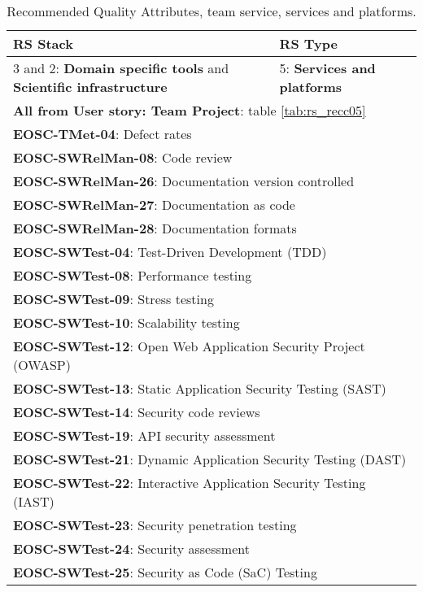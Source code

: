\begin{center}
\begin{table}

  \label{tab:rs_recc08}
  \small
  \begin{tabular}{|p{0.65\linewidth}|p{0.35\linewidth}|} \hline

    \textbf{RS Stack} & \textbf{RS Type} \\ \hline  \hline
    3 and 2: \textbf{Domain specific tools} and \textbf{Scientific infrastructure} &
    5: \textbf{Services and platforms} \\ \hline \hline
    \multicolumn{2}{|l|}{\textbf{All from User story: Team Project}: table \ref{tab:rs_recc05}} \\ \hline
    \multicolumn{2}{|l|}{\textbf{EOSC-TMet-04}: Defect rates} \\ \hline
    \multicolumn{2}{|l|}{\textbf{EOSC-SWRelMan-08}: Code review} \\ \hline
    \multicolumn{2}{|l|}{\textbf{EOSC-SWRelMan-26}: Documentation version controlled} \\ \hline
    \multicolumn{2}{|l|}{\textbf{EOSC-SWRelMan-27}: Documentation as code} \\ \hline
    \multicolumn{2}{|l|}{\textbf{EOSC-SWRelMan-28}: Documentation formats} \\ \hline
    \multicolumn{2}{|l|}{\textbf{EOSC-SWTest-04}: Test-Driven Development (TDD)} \\ \hline
    \multicolumn{2}{|l|}{\textbf{EOSC-SWTest-08}: Performance testing} \\ \hline
    \multicolumn{2}{|l|}{\textbf{EOSC-SWTest-09}: Stress testing} \\ \hline
    \multicolumn{2}{|l|}{\textbf{EOSC-SWTest-10}: Scalability testing} \\ \hline
    \multicolumn{2}{|l|}{\textbf{EOSC-SWTest-12}: Open Web Application Security Project (OWASP)} \\ \hline
    \multicolumn{2}{|l|}{\textbf{EOSC-SWTest-13}: Static Application Security Testing (SAST)} \\ \hline
    \multicolumn{2}{|l|}{\textbf{EOSC-SWTest-14}: Security code reviews} \\ \hline
    \multicolumn{2}{|l|}{\textbf{EOSC-SWTest-19}: API security assessment} \\ \hline
    \multicolumn{2}{|l|}{\textbf{EOSC-SWTest-21}: Dynamic Application Security Testing (DAST)} \\ \hline
    \multicolumn{2}{|l|}{\textbf{EOSC-SWTest-22}: Interactive Application Security Testing (IAST)} \\ \hline
    \multicolumn{2}{|l|}{\textbf{EOSC-SWTest-23}: Security penetration testing} \\ \hline
    \multicolumn{2}{|l|}{\textbf{EOSC-SWTest-24}: Security assessment} \\ \hline
    \multicolumn{2}{|l|}{\textbf{EOSC-SWTest-25}: Security as Code (SaC) Testing} \\ \hline

  \end{tabular}
  \caption{Recommended Quality Attributes, team service, services and platforms.}
\end{table}
\end{center}

